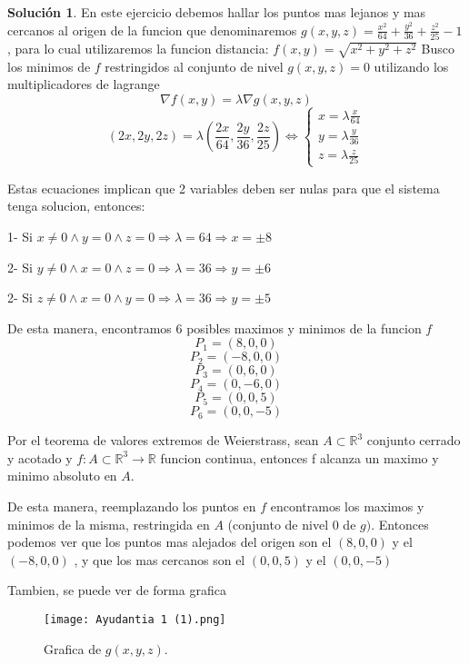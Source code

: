 \documentclass[10pt, a4paper]{report}
\theoremstyle{definition} %
\newtheorem{solution}{Solución}
\begin{document}
\begin{solution}
    En este ejercicio debemos hallar los puntos mas lejanos y mas cercanos al origen de la funcion que denominaremos $g(x,y,z)=\frac{x^2}{64}+\frac{y^2}{36}+\frac{z^2}{25}-1$ , para lo cual utilizaremos la funcion distancia: $f(x,y)=\sqrt{x^2+y^2+z^2}$ \newline Busco los minimos de $f$ restringidos al conjunto de nivel $g(x,y,z)=0$ utilizando los multiplicadores de lagrange
\[
        \nabla f(x,y)=\lambda \nabla g(x,y,z)
    \]
    \[
        (2x,2y,2z)=\lambda (\frac{2x}{64},\frac{2y}{36},\frac{2z}{25}) \iff \begin{cases}
            x = \lambda\frac{x}{64}\\
            y = \lambda\frac{y}{36}\\
            z = \lambda\frac{z}{25}
        \end{cases}
    \]
    
    Estas ecuaciones implican que 2 variables deben ser nulas para que el sistema tenga solucion, entonces:

1- Si $x\neq 0 \land y=0 \land z=0 \Rightarrow \lambda=64  \Rightarrow x=\pm 8$ 

2- Si $y\neq 0 \land x=0 \land z=0 \Rightarrow \lambda=36  \Rightarrow y=\pm 6$ 

2- Si $z\neq 0 \land x=0 \land y=0 \Rightarrow \lambda=36  \Rightarrow y=\pm 5$ 

    De esta manera, encontramos 6 posibles maximos y minimos de la funcion $f$
\[
        P_1=(8,0,0) 
         \]
         \[
        P_2=(-8,0,0) 
         \]
        \[
        P_3=(0,6,0) 
         \]
         \[
        P_4=(0,-6,0) 
         \]
         \[
        P_5=(0,0,5) 
         \]
         \[
        P_6=(0,0,-5) 
    \]
    
    Por el teorema de valores extremos de Weierstrass, sean $A \subset \mathbb{R}^3$ conjunto cerrado y acotado y $f:A\subset\mathbb{R}^3\rightarrow\mathbb{R} $ funcion continua, entonces f alcanza un maximo y minimo absoluto en $A$.
    
    De esta manera, reemplazando los puntos en $f$ encontramos los maximos y minimos de la misma, restringida en $A$ (conjunto de nivel 0 de $g)$. Entonces podemos ver que los puntos mas alejados del origen son el $(8,0,0)$ y el $(-8,0,0)$ , y que los mas cercanos son el $(0,0,5)$  y el $(0,0,-5)$ \newline
    
    Tambien, se puede ver de forma grafica
\begin{figure}[h!] %
    \centering
    \texttt{[image: Ayudantia 1 (1).png]} %
    \caption{Grafica de $g(x,y,z)$.}
    \label{fig:ejemplo} %
\end{figure}

\end{solution}
\end{document}

